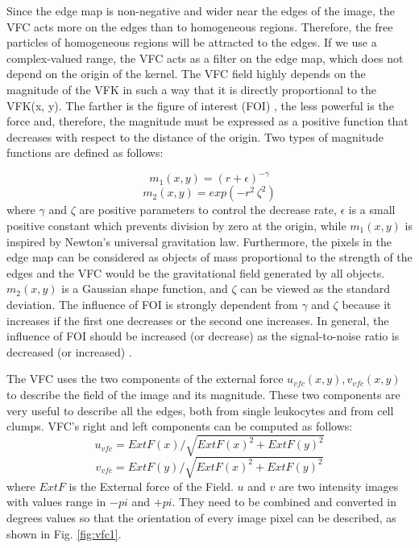 \documentclass[final,a4paper,12pt,english]{UnicaPhdThesis3}
\begin{document}
Since the edge map is non-negative and wider near the edges of the image, the VFC acts more on the edges than to homogeneous regions. Therefore, the free particles of homogeneous regions will be attracted to the edges. If we use a complex-valued range, the VFC acts as a filter on the edge map, which does not depend on the origin of the kernel. The VFC field highly depends on the magnitude of the VFK in such a way that it is directly proportional to the VFK(x, y). 
The farther is the figure of interest (FOI) \cite{Bing}, the less powerful is the force and, therefore, the magnitude must be expressed as a positive function that decreases with respect to the distance of the origin. Two types of magnitude functions are defined as follows:

\begin{equation}
{m} _{1} ( x,y ) =(r+\epsilon) ^{-\gamma}
\end{equation}
\begin{equation}
{m} _{2} ( x,y ) =exp(-r^{2}\, \zeta ^{2})
\end{equation}
where $\gamma$ and $\zeta$ are positive parameters to control the decrease rate, $\epsilon$ is a small positive constant which prevents division by zero at the origin, while ${m} _{1} ( x,y )$ is inspired by Newton's universal gravitation law. Furthermore, the pixels in the edge map can be considered as objects of mass proportional to the strength of the edges and the VFC would be the gravitational field generated by all objects. 
${m} _{2} ( x,y )$ is a Gaussian shape function, and $\zeta$ can be viewed as the standard deviation.
The influence of FOI is strongly dependent from $\gamma$ and $\zeta$ because it increases if the first one decreases or the second one increases. 
In general, the influence of FOI should be increased (or decrease) as the signal-to-noise ratio is decreased (or increased) \cite{Bing}.

The VFC uses the two components of the external force ${u} _{vfc} ( x,y ) , {v} _{vfc} (x,y)$ to describe the field of the image and its magnitude. These two components are very useful to describe all the edges, both from single leukocytes and from cell clumps. VFC's right and left components can be computed as follows:
\begin{equation}
{u} _{vfc}=ExtF(x)/\sqrt{ExtF(x)^{2} + ExtF(y)^{2}}
\end{equation}
\begin{equation}
{v} _{vfc}=ExtF(y)/\sqrt{ExtF(x)^{2} + ExtF(y)^{2}}
\end{equation}
where $ExtF$ is the External force of the Field. $u$ and $v$ are two intensity images with values range in $-pi$ and $+pi$. They need to be combined and converted in degrees values so that the orientation of every image pixel can be described, as shown in Fig. \ref{fig:vfc1}. 
\end{document}
